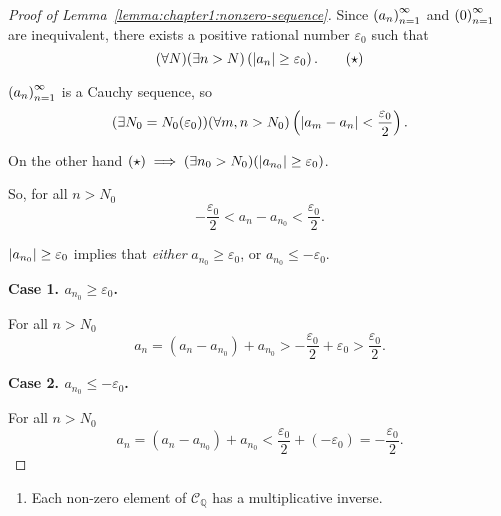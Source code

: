 \begin{proof}[Proof of Lemma~\ref{lemma:chapter1:nonzero-sequence}]
    Since ${\left({a_{n}}\right)}^{\infty}_{n=1}$ and ${\left({0}\right)}^{\infty}_{n=1}$ are inequivalent, there exists a positive rational number $\varepsilon_{0}$ such that
    \begin{equation*}
        (\forall N)(\exists n > N)\left(\left\vert{a_{n}}\right\vert\ge\varepsilon_{0}\right).\tag{$\star$}
    \end{equation*}

    ${\left({a_{n}}\right)}^{\infty}_{n=1}$ is a Cauchy sequence, so
    \[
        (\exists N_{0}=N_{0}(\varepsilon_{0}))(\forall m, n > N_{0})\left(\left\vert{a_{m} - a_{n}}\right\vert < \frac{\varepsilon_{0}}{2}\right).
    \]

    On the other hand $(\star)\implies (\exists n_{0} > N_{0})(\left\vert{a_{n_{0}}}\right\vert\ge\varepsilon_{0})$.

    So, for all $n > N_{0}$
    \[
        -\frac{\varepsilon_{0}}{2} < a_{n} - a_{n_{0}} < \frac{\varepsilon_{0}}{2}.
    \]

    $\left\vert{a_{n_{0}}}\right\vert\ge\varepsilon_{0}$ implies that \textit{either} $a_{n_{0}}\ge\varepsilon_{0}$, or $a_{n_{0}}\le-\varepsilon_{0}$.
    \bigskip

    \textbf{Case 1. $a_{n_{0}}\ge\varepsilon_{0}$.}

    For all $n > N_{0}$
    \[
        a_{n} = (a_{n} - a_{n_{0}}) + a_{n_{0}} > -\frac{\varepsilon_{0}}{2} + \varepsilon_{0} > \frac{\varepsilon_{0}}{2}.
    \]

    \textbf{Case 2. $a_{n_{0}}\le-\varepsilon_{0}$.}

    For all $n > N_{0}$
    \[
        a_{n} = (a_{n} - a_{n_{0}}) + a_{n_{0}} < \frac{\varepsilon_{0}}{2} + (-\varepsilon_{0}) = -\frac{\varepsilon_{0}}{2}.
    \]
\end{proof}

\begin{theorem}
    \begin{enumerate}[label={(F\arabic*)},start=9]
        \item Each non-zero element of $\mathscr{C}_{\mathbb{Q}}$ has a multiplicative inverse.
    \end{enumerate}
\end{theorem}

